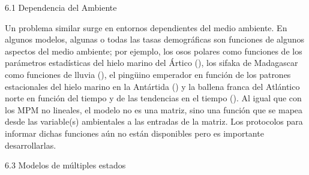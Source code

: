 \documentclass[
]{book}
\theoremstyle{definition}
\theoremstyle{definition}
\theoremstyle{definition}
\theoremstyle{definition}
\theoremstyle{remark}
\begin{document}
6.1 \textbar{} Dependencia del Ambiente

Un problema similar surge en entornos dependientes del medio ambiente. En algunos modelos, algunas o todas las tasas demográficas son funciones de algunos aspectos del medio ambiente; por ejemplo, los osos polares como funciones de los parámetros estadísticas del hielo marino del Ártico (\citet{regehr2010survival}), los sifaka de Madagascar como funciones de lluvia (\citet{lawler2009demography}), el pingüino emperador en función de los patrones estacionales del hielo marino en la Antártida (\citet{jenouvrier2012effects}) y la ballena franca del Atlántico norte en función del tiempo y de las tendencias en el tiempo (\citet{fujiwara2001demography}). Al igual que con los MPM no lineales, el modelo no es una matriz, sino una función que se mapea desde las variable(s) ambientales a las entradas de la matriz. Los protocolos para informar dichas funciones aún no están disponibles pero es importante desarrollarlas.

6.3 \textbar{} Modelos de múltiples estados
\end{document}
